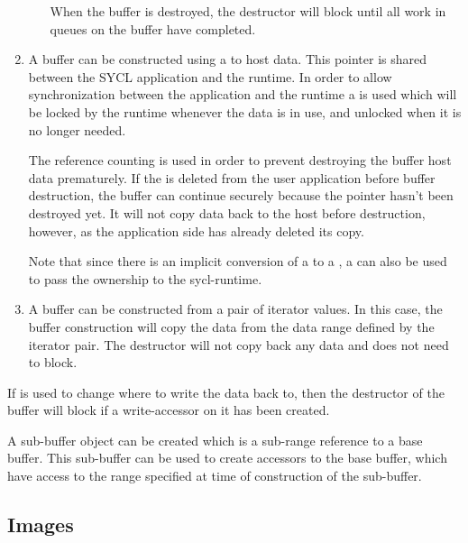 \begin{enumerate}
\begin{enumerate}
    When the buffer is destroyed, the destructor will block until all
    work in queues on the buffer have completed.

  \end{enumerate}

  \item
    A buffer can be constructed using a  to host data.
    This pointer is shared between the SYCL application and the runtime. In order
    to allow synchronization between the application and the runtime a
     is used which will be locked by the runtime whenever the
    data is in use, and unlocked when it is no longer needed.

    The  reference counting is used in order to prevent
    destroying the buffer host data prematurely. If the
     is deleted from the user application before buffer
    destruction, the buffer can continue securely because the pointer
    hasn't been destroyed yet.  It will not copy data back to the host before destruction, however,
    as the application side has already deleted its copy.

    Note that since there is an implicit conversion of a
     to a , a
     can also be used to pass the
    ownership to the \gls{sycl-runtime}.

  \item
    A buffer can be constructed from a pair of iterator values. In
    this case, the buffer construction will copy the data from the
    data range defined by the iterator pair. The destructor will
    not copy back any data and does not need to block.
    
  \end{enumerate}

If  is used to change where to write the
data back to, then the destructor of the buffer will block if a
write-accessor on it has been created.

A sub-buffer object can be created which is a sub-range reference to a
base buffer. This sub-buffer can be used to create accessors to the
base buffer, which have access to the range specified at time
of construction of the sub-buffer.

\subsection{Images}
\label{subsec:images}


